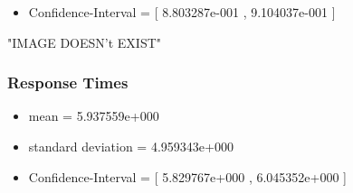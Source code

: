 \documentclass[aps,letterpaper,10pt]{revtex4}
\begin{document}
\begin{itemize}
\begin{itemize}
                        \item Confidence-Interval = [ 8.803287e-001 , 9.104037e-001 ]
                    \end{itemize}
                    "IMAGE DOESN't EXIST"
            \end{itemize}

        \newpage
        \subsubsection{Response Times}
            \begin{itemize}
                \item mean = 5.937559e+000
                \item standard deviation = 4.959343e+000
                \item Confidence-Interval = [ 5.829767e+000 , 6.045352e+000 ]
            \end{itemize}
            \begin{figure}[htp]
                \begin{center}
                \end{center}
            \end{figure}
\end{document}
